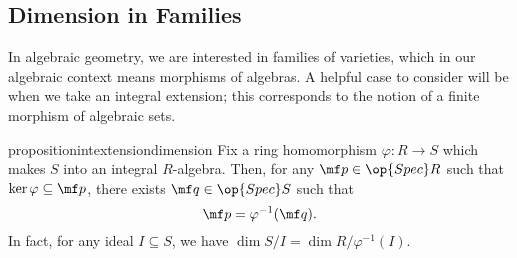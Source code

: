 \subsection{Dimension in Families}
In algebraic geometry, we are interested in families of varieties, which in our algebraic context means morphisms of algebras. A helpful case to consider will be when we take an integral extension; this corresponds to the notion of a finite morphism of algebraic sets.
\begin{restatable}{proposition}{intextensiondimension} \label{prop:intextensiondimen}
	Fix a ring homomorphism $\varphi:R\to S$ which makes $S$ into an integral $R$-algebra. Then, for any $\mf p\in\op{Spec}R$ such that $\ker\varphi\subseteq\mf p$, there exists $\mf q\in\op{Spec}S$ such that
	\[\mf p=\varphi^{-1}(\mf q).\]
	In fact, for any ideal $I\subseteq S$, we have $\dim S/I=\dim R/\varphi^{-1}(I)$.
\end{restatable}
